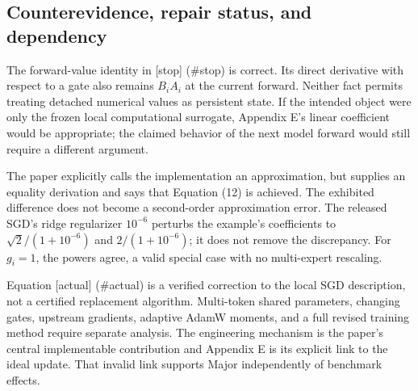 \documentclass[10pt]{article}
\begin{document}
\subsection*{Counterevidence, repair status, and dependency}
The forward-value identity in [stop] (\#stop) is correct. Its direct derivative with respect to a gate also remains \(B_iA_i\) at the current forward. Neither fact permits treating detached numerical values as persistent state. If the intended object were only the frozen local computational surrogate, Appendix E’s linear coefficient would be appropriate; the claimed behavior of the next model forward would still require a different argument.\par
The paper explicitly calls the implementation an approximation, but supplies an equality derivation and says that Equation (12) is achieved. The exhibited difference does not become a second-order approximation error. The released SGD’s ridge regularizer \(10^{-6}\) perturbs the example’s coefficients to \(\sqrt2/(1+10^{-6})\) and \(2/(1+10^{-6})\); it does not remove the discrepancy. For \(g_i=1\), the powers agree, a valid special case with no multi-expert rescaling.\par
Equation [actual] (\#actual) is a verified correction to the local SGD description, not a certified replacement algorithm. Multi-token shared parameters, changing gates, upstream gradients, adaptive AdamW moments, and a full revised training method require separate analysis. The engineering mechanism is the paper’s central implementable contribution and Appendix E is its explicit link to the ideal update. That invalid link supports Major independently of benchmark effects.\par
\end{document}
